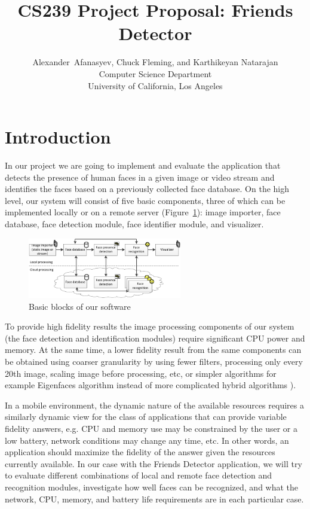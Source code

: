 \documentclass[onecolumn,conference]{IEEEtran}
\title{CS239 Project Proposal: Friends Detector}
\author{Alexander~Afanasyev, Chuck Fleming, and Karthikeyan Natarajan \\
\small Computer Science Department \\
\small University of California, Los Angeles 
}
\begin{document}
\maketitle

\section{Introduction}

In our project we are going to implement and evaluate the application that detects the presence of human faces in a given image or video stream and identifies the faces based on a previously collected face database. On the high level, our system will consist of five basic components, three of which can be implemented locally or on a remote server (Figure~\ref{fig:basic blocks}): image importer, face database, face detection module, face identifier module, and visualizer. 

\begin{figure}[htbp]
	\centering
		\includegraphics[width=0.6\textwidth]{basic_blocks}
	\caption{Basic blocks of our software}
	\label{fig:basic blocks}
\end{figure}

To provide high fidelity results the image processing components of our system (the face detection and identification modules) require significant CPU power and memory.  At the same time, a lower fidelity result from the same components can be obtained using coarser granularity by using fewer filters, processing only every 20th image, scaling image before processing, etc, or simpler algorithms for example Eigenfaces algorithm \cite{Turk:1991:Eigenfaces-for-recognition} instead of more complicated hybrid algorithms \cite{Zhao:2003:Face-recognition:}). 

In a mobile environment, the dynamic nature of the available resources requires a similarly dynamic view for the class of applications that can provide variable fidelity answers, e.g. CPU and memory use may be constrained by the user or a low battery, network conditions may change any time, etc. In other words, an application should maximize the fidelity of the answer given the resources currently available. In our case with the Friends Detector application, we will try to evaluate different combinations of local and remote face detection and recognition modules, investigate how well faces can be recognized, and what the network, CPU, memory, and battery life requirements are in each particular case.
\end{document}
